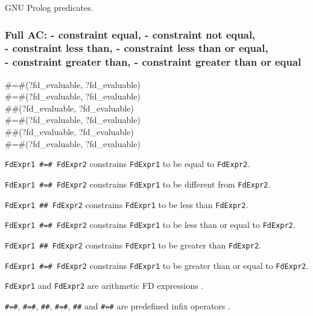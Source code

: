 \Portability

GNU Prolog predicates.

\subsubsection{Full AC:  - constraint equal, \label{Full-AC:-(:=:)/2}
                - constraint not equal, \\
                - constraint less than,
                - constraint less than or equal, \\
                - constraint greater than,
                - constraint greater than or equal}

\begin{TemplatesOneCol}
\#=\#(?fd\_evaluable, ?fd\_evaluable)\\
\#{\bs}=\#(?fd\_evaluable, ?fd\_evaluable)\\
\#{\lt}\#(?fd\_evaluable, ?fd\_evaluable)\\
\#={\lt}\#(?fd\_evaluable, ?fd\_evaluable)\\
\#{\gt}\#(?fd\_evaluable, ?fd\_evaluable)\\
\#{\gt}=\#(?fd\_evaluable, ?fd\_evaluable)

\end{TemplatesOneCol}

\Description

\texttt{FdExpr1 \#=\# FdExpr2} constrains \texttt{FdExpr1} to
be equal to \texttt{FdExpr2}.

\texttt{FdExpr1 \#{\bs}=\# FdExpr2} constrains \texttt{FdExpr1} to be
different from \texttt{FdExpr2}.

\texttt{FdExpr1 \#{\lt}\# FdExpr2} constrains \texttt{FdExpr1}
to be less than \texttt{FdExpr2}.

\texttt{FdExpr1 \#={\lt}\# FdExpr2} constrains \texttt{FdExpr1} to be
less than or equal to \texttt{FdExpr2}.

\texttt{FdExpr1 \#{\gt}\# FdExpr2} constrains \texttt{FdExpr1}
to be greater than \texttt{FdExpr2}.

\texttt{FdExpr1 \#{\gt}=\# FdExpr2} constrains \texttt{FdExpr1} to be
greater than or equal to \texttt{FdExpr2}.

\texttt{FdExpr1} and \texttt{FdExpr2} are arithmetic FD expressions
.

\texttt{\#=\#}, \texttt{\#{\bs}=\#}, \texttt{\#{\lt}\#},
\texttt{\#={\lt}\#}, \texttt{\#{\gt}\#} and \texttt{\#{\gt}=\#} are
predefined infix operators .

